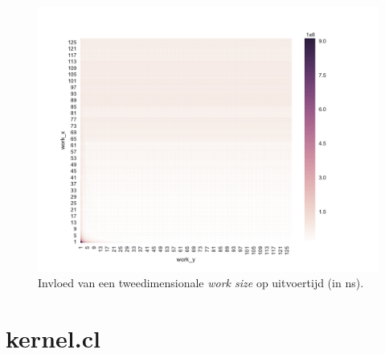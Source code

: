 \documentclass[twocolumn, a4paper]{article}
\begin{document}
\begin{figure}
    \centering
    \includegraphics[width=1.1\textwidth]{data/output_powers.pdf}
    \caption{Invloed van een tweedimensionale \emph{work size} op uitvoertijd (in ns).}\label{fig:output-all}
\end{figure}

\onecolumn

\appendix
\section{kernel.cl}
\inputminted[tabsize = 4, obeytabs, breaklines]{c}{../../code/zebra/test.cl}

\newpage

\end{document}
